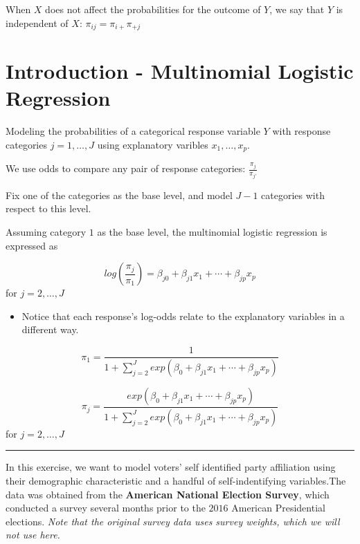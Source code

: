 \documentclass[]{article}
\providecommand{\tightlist}{%
  \setlength{\itemsep}{0pt}\setlength{\parskip}{0pt}}
\begin{document}
When \(X\) does not affect the probabilities for the outcome of \(Y\),
we say that \(Y\) is independent of \(X\):
\(\pi_{ij} = \pi_{i+} \pi_{+j}\)

\newpage

\section{Introduction - Multinomial Logistic
Regression}\label{introduction---multinomial-logistic-regression}

Modeling the probabilities of a categorical response variable \(Y\) with
response categories \(j = 1, \dots, J\) using explanatory varibles
\(x_1,\dots,x_p\).

We use odds to compare any pair of response categories:
\(\frac{\pi_j}{\pi_{j'}}\)

Fix one of the categories as the base level, and model \(J-1\)
categories with respect to this level.

Assuming category \(1\) as the base level, the multinomial logistic
regression is expressed as

\[
log \left( \frac{\pi_j}{\pi_1} \right) = \beta_{j0} + \beta_{j1} x_1 + \cdots + \beta_{jp} x_p
\] for \(j = 2, \dots , J\)

\begin{itemize}
\tightlist
\item
  Notice that each response's log-odds relate to the explanatory
  variables in a different way.
\end{itemize}

\[
  \pi_1 = \frac{1}{1 + \sum_{j=2}^J exp(\beta_0 + \beta_{j1}x_1 + \cdots + \beta_{jp}x_p) }
\]

\[
  \pi_j = \frac{exp(\beta_0 + \beta_{j1}x_1 + \cdots + \beta_{jp}x_p)}{1 + \sum_{j=2}^J exp(\beta_0 + \beta_{j1}x_1 + \cdots + \beta_{jp}x_p) }
\] for \(j = 2, \dots , J\)

\begin{center}\rule{0.5\linewidth}{\linethickness}\end{center}

In this exercise, we want to model voters' self identified party
affiliation using their demographic characteristic and a handful of
self-indentifying variables.The data was obtained from the
\textbf{American National Election Survey}, which conducted a survey
several months prior to the \(2016\) American Presidential elections.
\emph{Note that the original survey data uses survey weights, which we
will not use here.}
\end{document}
